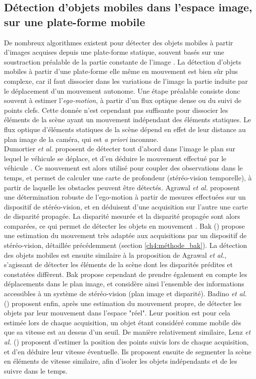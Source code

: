 \subsection{Détection d'objets mobiles dans l'espace image, sur une plate-forme mobile}
De nombreux algorithmes existent pour détecter des objets mobiles à partir d'images acquises depuis une plate-forme statique, souvent basés sur une soustraction préalable de la partie constante de l'image \cite{Piccardi2004}. La détection d'objets mobiles à partir d'une plate-forme elle même en mouvement est bien sûr plus complexe, car il faut dissocier dans les variations de l'image la partie induite par le déplacement d'un mouvement autonome. Une étape préalable consiste donc souvent à estimer l'\emph{ego-motion}, à partir d'un flux optique dense ou du suivi de points clefs. Cette donnée n'est cependant pas suffisante pour dissocier les éléments de la scène ayant un mouvement indépendant des éléments statiques. Le flux optique d'éléments statiques de la scène dépend en effet de leur distance au plan image de la caméra, qui est \textit{a priori} inconnue.\\

Dumortier \textit{et al.} proposent de détecter tout d'abord dans l'image le plan sur lequel le véhicule se déplace, et d'en déduire le mouvement effectué par le véhicule \cite{Dumortier}. Ce mouvement est alors utilisé pour coupler des observations dans le temps, et permet de calculer une carte de profondeur (stéréo-vision temporelle), à partir de laquelle les obstacles peuvent être détectés. Agrawal \textit{et al.} proposent une détermination robuste de l'ego-motion à partir de mesures effectuées sur un dispositif de stéréo-vision, et en déduisent d'une acquisition sur l'autre une carte de disparité propagée. La disparité mesurée et la disparité propagée sont alors comparées, ce qui permet de détecter les objets en mouvement \cite{Agrawal2007}. Bak (\cite{Bak2011}) propose une estimation du mouvement très adaptée aux acquisitions par un dispositif de stéréo-vision, détaillée précédemment (section  \ref{ch4:méthode_bak}). La détection des objets mobiles est ensuite similaire à la proposition de Agrawal \textit{et al.}, s'agissant de détecter les éléments de la scène dont les disparités prédites et constatées diffèrent. Bak propose cependant de prendre également en compte les déplacements dans le plan image, et considère ainsi l'ensemble des informations accessibles à un système de stéréo-vision (plan image et disparité). Badino \textit{et al.} (\cite{Badino2008}) proposent enfin, après une estimation du mouvement propre, de détecter les objets par leur mouvement dans l'espace "réel". Leur position est pour cela estimée lors de chaque acquisition, un objet étant considéré comme mobile dès que sa vitesse est au dessus d'un seuil. De manière relativement similaire, Lenz \textit{et al.} (\cite{Lenz2011}) proposent d'estimer la position des points suivis lors de chaque acquisition, et d'en déduire leur vitesse éventuelle. Ils proposent ensuite de segmenter la scène en éléments de vitesse similaire, afin d'isoler les objets indépendants et de les suivre dans le temps.\\

